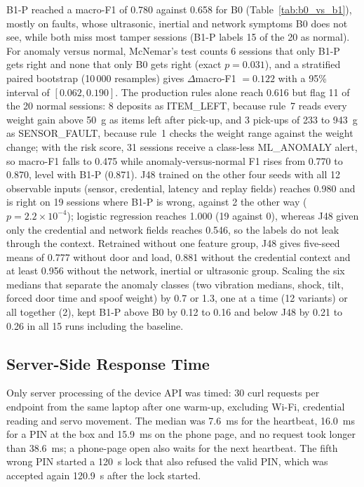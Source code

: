 \documentclass[sigconf,screen]{acmart}
\begin{document}
B1-P reached a macro-F1 of 0.780 against 0.658 for B0 (Table~\ref{tab:b0_vs_b1}), mostly on faults, whose ultrasonic,
inertial and network symptoms B0 does not see, while both miss most tamper sessions (B1-P labels 15 of the 20 as
normal). For anomaly versus normal, McNemar's test counts 6 sessions that only B1-P gets right and none that only B0
gets right (exact $p=0.031$), and a stratified paired bootstrap (10\,000 resamples) gives $\Delta$macro-F1 $=0.122$
with a 95\% interval of $[0.062, 0.190]$. The production rules alone reach 0.616 but flag 11 of the 20 normal sessions:
8 deposits as ITEM\_LEFT, because rule~7 reads every weight gain above 50~g as items left after pick-up, and 3 pick-ups
of 233 to 943~g as SENSOR\_FAULT, because rule~1 checks the weight range against the weight change; with the risk
score, 31 sessions receive a class-less ML\_ANOMALY alert, so macro-F1 falls to 0.475 while anomaly-versus-normal F1
rises from 0.770 to 0.870, level with B1-P (0.871). J48 trained on the other four seeds with all 12 observable inputs
(sensor, credential, latency and replay fields) reaches 0.980 and is right on 19 sessions where B1-P is wrong,
against 2 the other way ($p=2.2\times10^{-4}$); logistic regression reaches 1.000 (19 against 0), whereas J48 given
only the credential and network fields reaches 0.546, so the labels do not leak through the context. Retrained without
one feature group, J48 gives five-seed means of 0.777 without door and load, 0.881 without the credential context and
at least 0.956 without the network, inertial or ultrasonic group. Scaling the six medians that separate the anomaly
classes (two vibration medians, shock, tilt, forced door time and spoof weight) by 0.7 or 1.3, one at a time
(12 variants) or all together (2), kept B1-P above B0 by 0.12 to 0.16 and below J48 by 0.21 to 0.26 in all 15 runs
including the baseline.

\subsection{Server-Side Response Time}\label{sec:latency}

Only server processing of the device API was timed: 30 curl requests per endpoint from the same laptop after one
warm-up, excluding Wi-Fi, credential reading and servo movement. The median was 7.6~ms for the heartbeat, 16.0~ms for a
PIN at the box and 15.9~ms on the phone page, and no request took longer than 38.6~ms; a phone-page open also waits for
the next heartbeat. The fifth wrong PIN started a 120~s lock that also refused the valid PIN, which was accepted again
120.9~s after the lock started.
\end{document}
